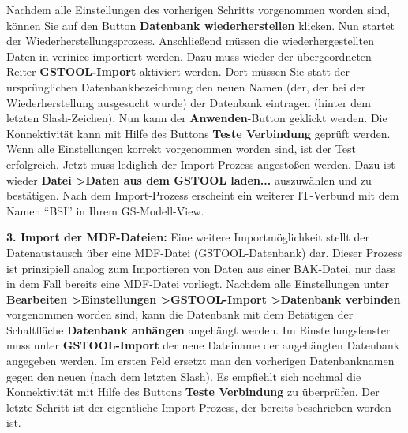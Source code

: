 \documentclass[a4paper,10pt]{book}
\begin{document}
Nachdem alle Einstellungen des vorherigen Schritts vorgenommen worden sind,
können Sie auf den Button \textbf{Datenbank wiederherstellen} klicken. Nun
startet der Wiederherstellungsprozess. Anschließend müssen die
wiederhergestellten Daten in verinice importiert werden. Dazu muss wieder der
übergeordneten Reiter \textbf{\textsc{GSTOOL}-Import} aktiviert werden. Dort
müssen Sie statt der ursprünglichen Datenbankbezeichnung den neuen Namen (der,
der bei der Wiederherstellung ausgesucht wurde) der Datenbank eintragen (hinter
dem letzten Slash-Zeichen). Nun kann der \textbf{Anwenden}-Button geklickt
werden. Die Konnektivität kann mit Hilfe des Buttons \textbf{Teste Verbindung}
geprüft werden. Wenn alle Einstellungen korrekt vorgenommen worden sind, ist der
Test erfolgreich. Jetzt muss lediglich der Import-Prozess angestoßen werden.
Dazu ist wieder \textbf{Datei \textgreater Daten aus dem \textsc{GSTOOL}
laden...} auszuwählen und zu bestätigen. Nach dem Import-Prozess erscheint ein
weiterer IT-Verbund mit dem Namen ``BSI'' in Ihrem GS-Modell-View.

\textbf{3. Import der MDF-Dateien:}
Eine weitere Importmöglichkeit stellt der Datenaustausch über eine MDF-Datei (GSTOOL-Datenbank) dar.
Dieser Prozess ist prinzipiell analog zum Importieren von Daten aus einer BAK-Datei, nur dass in dem Fall bereits eine MDF-Datei vorliegt.
Nachdem alle Einstellungen unter \textbf{Bearbeiten \textgreater Einstellungen \textgreater \textsc{GSTOOL}-Import \textgreater Datenbank verbinden} vorgenommen worden sind, kann die
Datenbank mit dem Betätigen der Schaltfläche \textbf{Datenbank anhängen} angehängt werden.
Im Einstellungsfenster muss unter \textbf{\textsc{GSTOOL}-Import} der neue Dateiname der angehängten Datenbank angegeben werden. Im ersten
Feld ersetzt man den vorherigen Datenbanknamen gegen den neuen (nach dem letzten Slash). Es empfiehlt sich nochmal die Konnektivität mit Hilfe
des Buttons \textbf{Teste Verbindung} zu überprüfen. Der letzte Schritt ist der eigentliche Import-Prozess, der bereits beschrieben worden ist.
\end{document}
